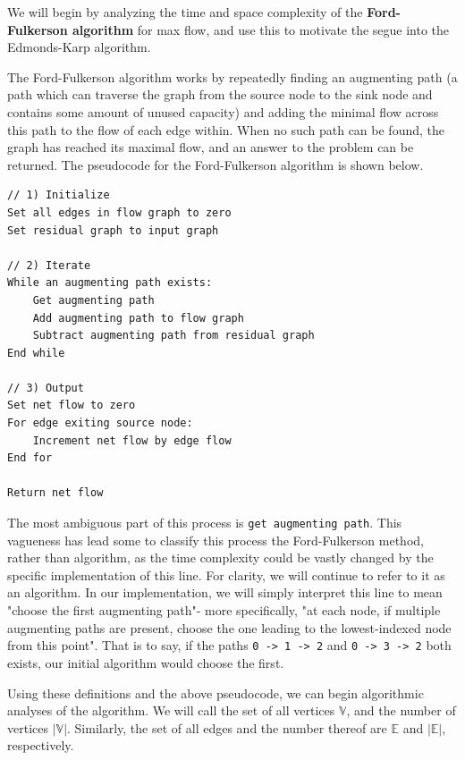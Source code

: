 \documentclass[12pt]{amsart}
\begin{document}
    We will begin by analyzing the time and space complexity
    of the \textbf{Ford-Fulkerson algorithm} for max flow, and
    use this to motivate the segue into the Edmonds-Karp
    algorithm.

    The Ford-Fulkerson algorithm works by repeatedly finding an
    augmenting path (a path which can traverse the graph from
    the source node to the sink node and contains some amount of
    unused capacity) and adding the minimal flow across this
    path to the flow of each edge within. When no such path can
    be found, the graph has reached its maximal flow, and an
    answer to the problem can be returned. The pseudocode for
    the Ford-Fulkerson algorithm is shown below.

\begin{verbatim}
// 1) Initialize
Set all edges in flow graph to zero
Set residual graph to input graph

// 2) Iterate
While an augmenting path exists:
    Get augmenting path
    Add augmenting path to flow graph
    Subtract augmenting path from residual graph
End while

// 3) Output
Set net flow to zero
For edge exiting source node:
    Increment net flow by edge flow
End for

Return net flow
\end{verbatim}

    The most ambiguous part of this process is
    \verb|get augmenting path|. This vagueness has lead some to
    classify this process the Ford-Fulkerson method, rather than
    algorithm, as the time complexity could be vastly changed by
    the specific implementation of this line. For clarity, we
    will continue to refer to it as an algorithm. In our
    implementation, we will simply interpret this line to mean
    "choose the first augmenting path"- more specifically, 
    "at each node, if multiple augmenting paths are present,
    choose the one leading to the lowest-indexed node from this
    point". That is to say, if the paths \verb|0 -> 1 -> 2| and
    \verb|0 -> 3 -> 2| both exists, our initial algorithm would
    choose the first.

    Using these definitions and the above pseudocode, we can
    begin algorithmic analyses of the algorithm. We will call
    the set of all vertices $\mathbb{V}$, and the number of
    vertices $\vert \mathbb{V} \vert$. Similarly, the set of all
    edges and the number thereof are $\mathbb{E}$ and
    $\vert \mathbb{E} \vert$, respectively.
    
\end{document}
